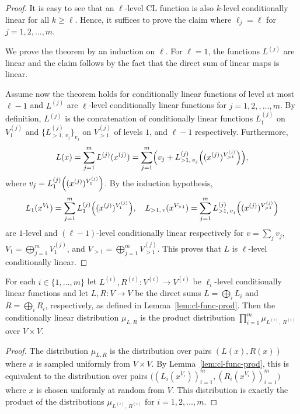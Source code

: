 \begin{proof}
  It is easy to see that an $\ell$-level CL function is also $k$-level
  conditionally linear for all $k \ge \ell$.
  Hence, it suffices to prove the claim where $\ell_j = \ell$ for $j=1, 2,
  \ldots, m$.

  We prove the theorem by an induction on $\ell$.
  For $\ell = 1$, the functions $L^{(j)}$ are linear and the claim follows by
  the fact that the direct sum of linear maps is linear.

  Assume now the theorem holds for conditionally linear functions of level at
  most $\ell-1$ and $L^{(j)}$ are $\ell$-level conditionally linear functions
  for $j=1, 2, ,\ldots, m$.
  By definition, $L^{(j)}$ is the concatenation of conditionally linear
  functions $L^{(j)}_{1}$ on $V^{(j)}_1$ and $\{ L^{(j)}_{>1,\, v_j} \}_{v_j}$
  on $V^{(j)}_{>1}$ of levels $1$, and $\ell-1$ respectively.
  Furthermore,
  \begin{equation*}
    L(x) = \sum_{j=1}^m L^{(j)} (x^{(j)}) = \sum_{j=1}^m \Bigl( v_j +
    L^{(j)}_{>1,\, v_j}
    \Bigl((x^{(j)})^{V^{(j)}_{>1}} \Bigr) \Bigr),
  \end{equation*}
  where $v_j = L^{(j)}_{1}\Bigl( (x^{(j)})^{V^{(j)}_1}
    \Bigr)$.
  By the induction hypothesis,
  \begin{equation*}
    L_{1} (x^{V_1}) = \sum_{j=1}^m L^{(j)}_{1}\Bigl( (x^{(j)})^{V^{(j)}_1}
    \Bigr),\quad L_{>1,\, v} (x^{V_{>1}}) = \sum_{j=1}^m L^{(j)}_{>1,\, v_j}
    \Bigl((x^{(j)})^{V^{(j)}_{>1}} \Bigr)
  \end{equation*}
  are $1$-level and $(\ell-1)$-level conditionally linear respectively for $v =
  \sum_j v_j$, $V_1 = \bigoplus_{j=1}^m V^{(j)}_1$, and $V_{>1} =
  \bigoplus_{j=1}^m V^{(j)}_{>1}$.
  This proves that $L$ is $\ell$-level conditionally linear.
\end{proof}

\begin{lemma}
  \label{lem:cl-dist-prod}
  For each $i \in \{1,\ldots,m\}$ let $L^{(i)}, R^{(i)} : V^{(i)} \to V^{(i)}$
  be $\ell_i$-level conditionally linear functions and let $L, R: V \to V$ be the
  direct sums $L = \bigoplus_i L_i$ and $R = \bigoplus_i R_i$, respectively, as
  defined in Lemma~\ref{lem:cl-func-prod}.
  Then the conditionally linear distribution $\mu_{L, R}$ is the product
  distribution $\prod_{i=1}^m \mu_{L^{(i)},\, R^{(i)}}$ over $V \times V$.
\end{lemma}

\begin{proof}
	The distribution $\mu_{L,R}$ is the distribution over pairs $(L(x),R(x))$
  where $x$ is sampled uniformly from $V \times V$.
  By Lemma~\ref{lem:cl-func-prod}, this is equivalent to the distribution over
  pairs $\bigl( (L_i(x^{V_i}))_{i=1}^m, (R_i(x^{V_i}))_{i=1}^m \bigr)$ where $x$
  is chosen uniformly at random from $V$.
  This distribution is exactly the product of the distributions $
  \mu_{L^{(i)},\, R^{(i)}}$ for $i = 1, 2, \ldots, m$.
\end{proof}

